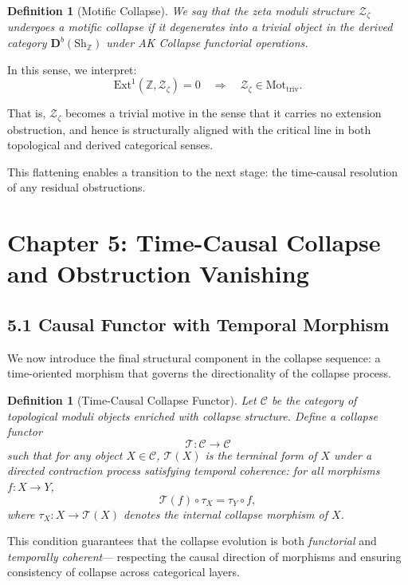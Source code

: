 \documentclass[11pt]{article}
\newtheorem{definition}[theorem]{Definition}
\begin{document}
\begin{definition}[Motific Collapse]
We say that the zeta moduli structure $\mathcal{Z}_\zeta$ undergoes a motific collapse if it degenerates into a trivial object in the derived category $\mathbf{D}^b(\text{Sh}_\mathbb{Z})$ under AK Collapse functorial operations.
\end{definition}

In this sense, we interpret:
\[
\mathrm{Ext}^1(\mathbb{Z}, \mathcal{Z}_\zeta) = 0 \quad \Rightarrow \quad \mathcal{Z}_\zeta \in \text{Mot}_{\text{triv}}.
\]

That is, $\mathcal{Z}_\zeta$ becomes a trivial motive in the sense that it carries no extension obstruction,  
and hence is structurally aligned with the critical line in both topological and derived categorical senses.

This flattening enables a transition to the next stage: the time-causal resolution of any residual obstructions.



\section{Chapter 5: Time-Causal Collapse and Obstruction Vanishing}

\subsection{5.1 Causal Functor with Temporal Morphism}

We now introduce the final structural component in the collapse sequence:  
a time-oriented morphism that governs the directionality of the collapse process.

\begin{definition}[Time-Causal Collapse Functor]
Let $\mathcal{C}$ be the category of topological moduli objects enriched with collapse structure.  
Define a collapse functor
\[
\mathcal{T} : \mathcal{C} \rightarrow \mathcal{C}
\]
such that for any object $X \in \mathcal{C}$, $\mathcal{T}(X)$ is the terminal form of $X$ under a directed contraction process  
satisfying temporal coherence: for all morphisms $f : X \rightarrow Y$,
\[
\mathcal{T}(f) \circ \tau_X = \tau_Y \circ f,
\]
where $\tau_X : X \rightarrow \mathcal{T}(X)$ denotes the internal collapse morphism of $X$.

\end{definition}

This condition guarantees that the collapse evolution is both \emph{functorial} and \emph{temporally coherent}—  
respecting the causal direction of morphisms and ensuring consistency of collapse across categorical layers.
\end{document}
